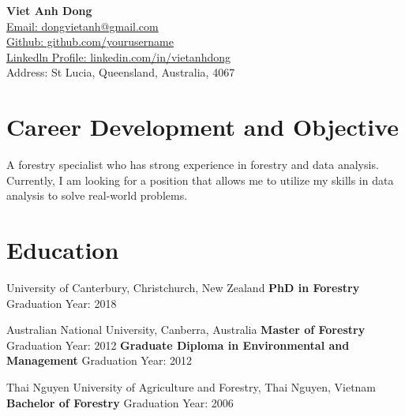 \documentclass[a4paper,12pt]{article}
\begin{document}
\begin{center}
    {\LARGE \textbf{Viet Anh Dong}} \\
    \vspace{1mm}
    \href{mailto:dongvietanh@gmail.com}{Email: dongvietanh@gmail.com} \\
    \href{https://github.com/yourusername}{Github: github.com/yourusername} \\
    \href{https://www.linkedin.com/in/vietanhdong}{Linkedln Profile: linkedin.com/in/vietanhdong}\\
    Address: St Lucia, Queensland, Australia, 4067 \\
\end{center}

\section*{Career Development and Objective}
A forestry specialist who has strong experience in forestry and data analysis. \newline
Currently, I am looking for a position that allows me to utilize my skills in data analysis to solve real-world problems.

\section*{Education}
University of Canterbury, Christchurch, New Zealand \newline
\textbf{PhD in Forestry} \hfill Graduation Year: 2018 \newline

\par %
\noindent
Australian National University, Canberra, Australia \newline
\textbf{Master of Forestry} \hfill Graduation Year: 2012 \newline
\textbf{Graduate Diploma in Environmental and Management} \hfill Graduation Year: 2012 \newline

\par %
\noindent
Thai Nguyen University of Agriculture and Forestry, Thai Nguyen, Vietnam \newline
\textbf{Bachelor of Forestry} \hfill Graduation Year: 2006

\end{document}
